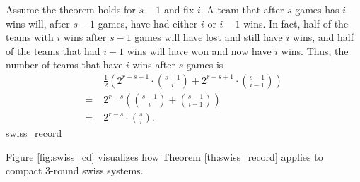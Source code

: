 {{        Assume the theorem holds for $s-1$ and fix $i$. A team that after $s$ games has $i$ wins will, after $s-1$ games, have had either $i$ or $i-1$ wins. In fact, half of the teams with $i$ wins after $s-1$ games will have lost and still have $i$ wins, and half of the teams that had $i-1$ wins will have won and now have $i$ wins. Thus,
        the number of teams that have $i$ wins after $s$ games is \begin{align*}
            &\; \frac{1}{2}\left(2^{r-s+1} \cdot \binom{s - 1}{i} + 2^{r-s+1} \cdot \binom{s - 1}{i - 1}\right)\\
            =&\; 2^{r-s} \left(\binom{s - 1 }{i} + \binom{s - 1}{i - 1}\right)\\
            =&\;2^{r-s} \cdot \binom{s }{i}.
        \end{align*}
    }{swiss_record}

    Figure \ref{fig:swiss_cd} visualizes how Theorem \ref{th:swiss_record} applies to compact $3$-round swiss systems.

}
